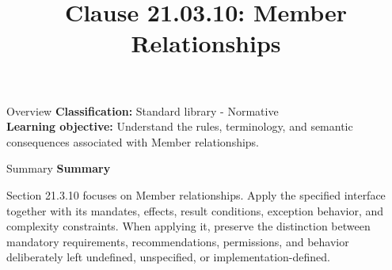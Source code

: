 \documentclass[10pt,letterpaper]{article}
\title{Clause 21.03.10: Member Relationships}
\author{}
\date{}
\begin{document}
\maketitle
\begin{CornellOverviewBox}{Overview}
\textbf{Classification:} Standard library - Normative\\[2pt]
\textbf{Learning objective:} Understand the rules, terminology, and semantic consequences associated with Member relationships.
\end{CornellOverviewBox}\begin{CornellSummaryBox}{Summary}
{\sffamily\bfseries\color{Accent} Summary}\par\vspace{3pt}Section 21.3.10 focuses on Member relationships. Apply the specified interface together with its mandates, effects, result conditions, exception behavior, and complexity constraints. When applying it, preserve the distinction between mandatory requirements, recommendations, permissions, and behavior deliberately left undefined, unspecified, or implementation-defined.
\end{CornellSummaryBox}
\end{document}
